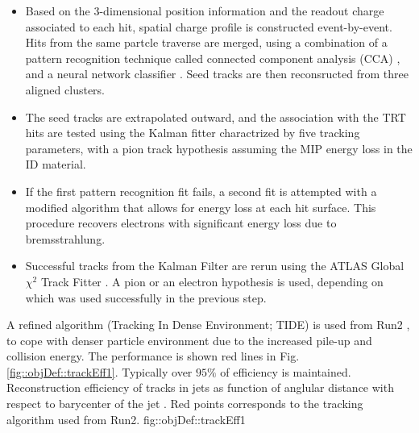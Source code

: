 \begin{itemize}
\item Based on the 3-dimensional position information and the readout charge associated to each hit, 
spatial charge profile is constructed event-by-event. 
Hits from the same partcle traverse are merged, using a combination of a pattern recognition technique called connected component analysis (CCA) \cite{CCApatterRecog}, and a neural network classifier \cite{NNClustering}.
Seed tracks are then reconsructed from three aligned clusters.

\item The seed tracks are extrapolated outward,
and the association with the TRT hits are tested using the Kalman fitter charactrized by five tracking parameters,
with a pion track hypothesis assuming the MIP energy loss in the ID material.

\item If the first pattern recognition fit fails, a second fit is attempted with a modified algorithm that allows for energy loss at each hit surface. This procedure recovers electrons with significant energy loss due to bremsstrahlung.

\item Successful tracks from the Kalman Filter are rerun using the ATLAS Global $\chi^2$ Track Fitter \cite{157_ATLASGlobTrackFitter}.
A pion or an electron hypothesis is used, depending on which was used successfully in the previous step.

\end{itemize}
A refined algorithm (Tracking In Dense Environment; TIDE) is used from Run2 \cite{130_trackingRun2}, 
to cope with denser particle environment due to the increased pile-up and collision energy.
The performance is shown red lines in Fig. \ref{fig::objDef::trackEff1}. Typically over $95\%$ of efficiency is maintained. \\ 

{Reconstruction efficiency of tracks in jets as function of anglular distance with respect to barycenter of the jet \cite{130_trackingRun2}}. Red points corresponds to the tracking algorithm used from Run2.
{fig::objDef::trackEff1}



